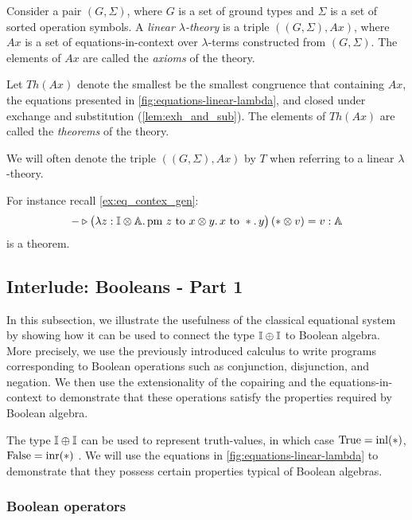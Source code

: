 \begin{definition} \label{def:linear_lambda_theory}
  Consider a pair $(G, \Sigma)$, where $G$ is a set of ground types and $\Sigma$ is a set of sorted operation symbols. A \emph{ linear $\lambda$-theory} is a triple $((G, \Sigma), Ax)$, where $Ax$ is a set of equations-in-context over $\lambda$-terms constructed from $(G, \Sigma)$. The elements of $Ax$ are called the \emph{axioms} of the theory.
\end{definition}

 Let $Th(Ax)$ denote the smallest be the smallest
 congruence that containing $Ax$, the equations presented in \autoref{fig:equations-linear-lambda}, and closed under exchange and substitution (\autoref{lem:exh_and_sub}). The elements of $Th(Ax)$ are called the \emph{theorems} of the theory.

 We will often denote the triple $((G, \Sigma), Ax)$ by $T$ when referring to a  linear $\lambda$-theory.

 For instance recall \autoref{ex:eq_contex_gen}: 
 $$ - \triangleright \big(\lambda z : \mathbb{I} \otimes \mathbb{A}.\, \text{pm } z \text{ to } x \otimes y.\, x \text{ to } *.\, y\big)\, (* \otimes v)=  v : \mathbb{A} $$
 is a theorem.

\subsection{Interlude: Booleans - Part 1} \label{subsec:interlude_bool}



In this subsection, we illustrate the usefulness of the classical equational system by showing how it can be used to connect the type $\mathbb{I} \oplus \mathbb{I}$ to Boolean algebra. More precisely, we use the previously introduced calculus to write programs corresponding to Boolean operations such as conjunction, disjunction, and negation. We then use the extensionality of the copairing and the equations-in-context to demonstrate that these operations satisfy the properties required by Boolean algebra.

The type $\mathbb{I} \oplus \mathbb{I}$ can be used to represent truth-values, in which case $\text{True} = \mathrm{inl}(*)$, $\text{False} = \mathrm{inr}(*)$ \cite{selinger2013lecture}. We will use the equations in \autoref{fig:equations-linear-lambda} to demonstrate that they possess certain properties typical of Boolean algebras.

\subsubsection{Boolean operators}

